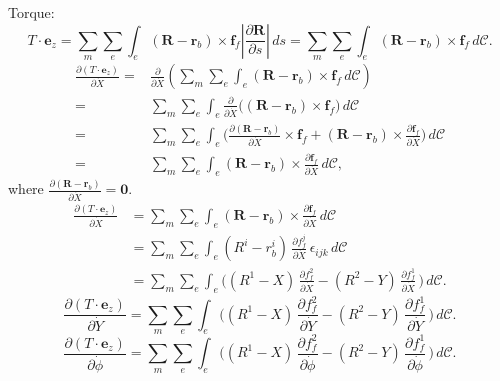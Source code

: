 \documentclass[a4paper,12pt]{article}
\begin{document}
Torque:
\begin{equation}
	\label{eqn:139}
	T\cdot \bm{e}_z= \sum_m \sum_e \int_e (\bm{R}-\bm{r}_b)\times\bm{f}_f \left|\frac{\partial\textbf{R}}{\partial s}\right|\,ds=\sum_m \sum_e \int_e (\bm{R}-\bm{r}_b)\times\bm{f}_f\,d\mathcal{C}.
\end{equation}
\begin{equation}
	\label{eqn:140}
	\begin{aligned}
		\frac{\partial (T\cdot \bm{e}_z)}{\partial \dot{X}}=& \frac{\partial}{\partial \dot{X}}\left(\sum_m \sum_e \int_e (\bm{R}-\bm{r}_b)\times\bm{f}_f\,d\mathcal{C}\right)\\
		=&\sum_m \sum_e \int_e \frac{\partial}{\partial \dot{X}}\Big((\bm{R}-\bm{r}_b)\times\bm{f}_f\Big)\,d\mathcal{C}\\
		=&\sum_m \sum_e \int_e \Big(\frac{\partial (\bm{R}-\bm{r}_b)}{\partial \dot{X}}\times \bm{f}_f+(\bm{R}-\bm{r}_b)\times \frac{\partial \bm{f}_f}{\partial \dot{X}}\Big)\,d\mathcal{C}\\
		=&\sum_m \sum_e \int_e (\bm{R}-\bm{r}_b)\times \frac{\partial \bm{f}_f}{\partial \dot{X}}\,d\mathcal{C},
	\end{aligned}
\end{equation}
where $\frac{\partial (\bm{R}-\bm{r}_b)}{\partial \dot{X}}=\bm{0}$.
\begin{equation}
	\label{eqn:141}
	\begin{aligned}
	\frac{\partial (T\cdot \bm{e}_z)}{\partial \dot{X}}&= \sum_m \sum_e \int_e (\bm{R}-\bm{r}_b)\times \frac{\partial \bm{f}_f}{\partial \dot{X}}\,d\mathcal{C}\\
	&=\sum_m \sum_e \int_e (R^i-r_b^i)\, \frac{\partial f_f^j}{\partial \dot{X}}\, \epsilon_{ijk}\,d\mathcal{C}\\
	&=\sum_m \sum_e \int_e \Big((R^1-X)\, \frac{\partial f_f^2}{\partial \dot{X}}-(R^2-Y)\, \frac{\partial f_f^1}{\partial \dot{X}}\,\Big)\,d\mathcal{C}.
    \end{aligned}
\end{equation}
\begin{equation}
	\label{eqn:142}
\frac{\partial (T\cdot \bm{e}_z)}{\partial \dot{Y}}=\sum_m \sum_e \int_e \Big((R^1-X)\, \frac{\partial f_f^2}{\partial \dot{Y}}-(R^2-Y)\, \frac{\partial f_f^1}{\partial \dot{Y}}\,\Big)\,d\mathcal{C}.
\end{equation}
\begin{equation}
	\label{eqn:143}
	\frac{\partial (T\cdot \bm{e}_z)}{\partial \dot{\phi}}=\sum_m \sum_e \int_e \Big((R^1-X)\, \frac{\partial f_f^2}{\partial \dot{\phi}}-(R^2-Y)\, \frac{\partial f_f^1}{\partial \dot{\phi}}\,\Big)\,d\mathcal{C}.
\end{equation}
\end{document}
